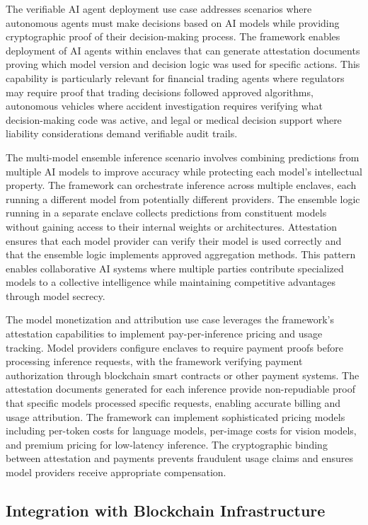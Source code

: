 The verifiable AI agent deployment use case addresses scenarios where autonomous agents must make decisions based on AI models while providing cryptographic proof of their decision-making process. The framework enables deployment of AI agents within enclaves that can generate attestation documents proving which model version and decision logic was used for specific actions. This capability is particularly relevant for financial trading agents where regulators may require proof that trading decisions followed approved algorithms, autonomous vehicles where accident investigation requires verifying what decision-making code was active, and legal or medical decision support where liability considerations demand verifiable audit trails.

The multi-model ensemble inference scenario involves combining predictions from multiple AI models to improve accuracy while protecting each model's intellectual property. The framework can orchestrate inference across multiple enclaves, each running a different model from potentially different providers. The ensemble logic running in a separate enclave collects predictions from constituent models without gaining access to their internal weights or architectures. Attestation ensures that each model provider can verify their model is used correctly and that the ensemble logic implements approved aggregation methods. This pattern enables collaborative AI systems where multiple parties contribute specialized models to a collective intelligence while maintaining competitive advantages through model secrecy.

The model monetization and attribution use case leverages the framework's attestation capabilities to implement pay-per-inference pricing and usage tracking. Model providers configure enclaves to require payment proofs before processing inference requests, with the framework verifying payment authorization through blockchain smart contracts or other payment systems. The attestation documents generated for each inference provide non-repudiable proof that specific models processed specific requests, enabling accurate billing and usage attribution. The framework can implement sophisticated pricing models including per-token costs for language models, per-image costs for vision models, and premium pricing for low-latency inference. The cryptographic binding between attestation and payments prevents fraudulent usage claims and ensures model providers receive appropriate compensation.

\subsection{Integration with Blockchain Infrastructure}

